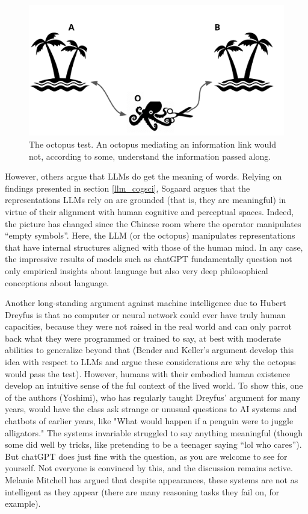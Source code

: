 \begin{figure}[h]
\centering
\includegraphics[scale=.5]{./images/octopusTest}
\caption[TODO.]{The octopus test. An octopus mediating an information link would not, according to some, understand the information passed along.}
\label{octopusTest}
\end{figure}

However, others argue that LLMs do get the meaning of words. Relying on findings presented in section \ref{llm_cogsci}, Sogaard \cite{sogaard2023grounding} argues that the representations LLMs rely on are grounded (that is, they are meaningful) in virtue of their alignment with human cognitive and perceptual spaces. Indeed, the picture has changed since the Chinese room where the operator manipulates ``empty symbols''. Here, the LLM (or the octopus) manipulates representations that have internal structures aligned with those of the human mind. In any case, the impressive results of models such as chatGPT fundamentally question not only empirical insights about language but also very deep philosophical conceptions about language.

Another long-standing argument against machine intelligence due to Hubert Dreyfus \cite{dreyfus1992computers} is that no computer or neural network could ever have truly human capacities, because they were not raised in the real world and can only parrot back what they were programmed or trained to say, at best with moderate abilities to generalize beyond that (Bender and Keller's argument develop this idea with respect to LLMs and argue these considerations are why the octopus would pass the test). However, humans with their embodied human existence develop an intuitive sense of the ful context of the lived world. To show this, one of the authors (Yoshimi), who has regularly taught Dreyfus'  argument for many years, would have the class ask strange or unusual questions to AI systems and chatbots of earlier years, like "What would happen if a penguin were to juggle alligators." The systems invariable struggled to say anything meaningful (though some did well by tricks, like pretending to be a teenager saying ``lol who cares''). But chatGPT does just fine with the question, as you are welcome to see for yourself. Not everyone is convinced by this, and the discussion remains active. Melanie Mitchell \cite{mitchell2021ai} has argued that despite appearances, these systems are not as intelligent as they appear (there are many reasoning tasks they fail on, for example).

